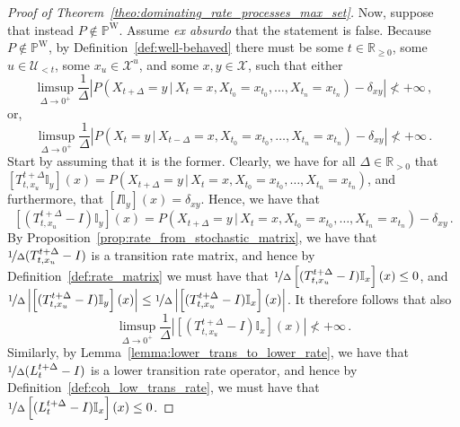 \documentclass[10pt]{paper}
\theoremstyle{definition}
\newcommand{\reals}{\mathbb{R}}
\newcommand{\realspos}{\reals_{>0}}
\newcommand{\realsnonneg}{\reals_{\geq 0}}
\newcommand{\states}{\mathcal{X}}
\newcommand{\processes}{\mathbb{P}}
\newcommand{\wprocesses}{\processes^{\mathrm{W}}}
\newcommand{\ind}[1]{\mathbb{I}_{#1}}
\newcommand{\abs}[1]{\left\vert #1 \right\vert}
\begin{document}
\begin{proof}[Proof of Theorem~\ref{theo:dominating_rate_processes_max_set}]
Now, suppose that instead $P\notin\wprocesses$. Assume \emph{ex absurdo} that the statement is false. Because $P\notin\wprocesses$, by Definition~\ref{def:well-behaved} there must be some $t\in\realsnonneg$, some $u\in\mathcal{U}_{<t}$, some $x_u\in\states^u$, and some $x,y\in\states$, such that either 
\begin{equation*}
\limsup_{\Delta\to0^+}\frac{1}{\Delta}\abs{P(X_{t+\Delta}=y\,\vert\,X_t=x,X_{t_0}=x_{t_0},\ldots,X_{t_n}=x_{t_n})-\delta_{xy}}\nless+\infty\,,
\end{equation*}
or,
\begin{equation*}
\limsup_{\Delta\to0^+}\frac{1}{\Delta}\abs{P(X_{t}=y\,\vert\,X_{t-\Delta}=x,X_{t_0}=x_{t_0},\ldots,X_{t_n}=x_{t_n})-\delta_{xy}}\nless+\infty\,.
\end{equation*}
Start by assuming that it is the former. Clearly, we have for all $\Delta\in\realspos$ that $\left[T_{t,x_u}^{t+\Delta}\ind{y}\right](x)=P(X_{t+\Delta}=y\,\vert\,X_t=x,X_{t_0}=x_{t_0},\ldots,X_{t_n}=x_{t_n})$, and furthermore, that $\left[I\ind{y}\right](x)=\delta_{xy}$. Hence, we have that
\begin{equation*}
\left[(T_{t,x_u}^{t+\Delta}-I)\ind{y}\right](x) = P(X_{t+\Delta}=y\,\vert\,X_t=x,X_{t_0}=x_{t_0},\ldots,X_{t_n}=x_{t_n}) - \delta_{xy}\,.
\end{equation*}
By Proposition~\ref{prop:rate_from_stochastic_matrix}, we have that $\nicefrac{1}{\Delta}(T_{t,x_u}^{t+\Delta}-I)$ is a transition rate matrix, and hence by Definition~\ref{def:rate_matrix} we must have that $\nicefrac{1}{\Delta}\left[(T_{t,x_u}^{t+\Delta}-I)\ind{x}\right](x)\leq 0$, and $\nicefrac{1}{\Delta}\abs{\left[(T_{t,x_u}^{t+\Delta}-I)\ind{y}\right](x)}\leq\nicefrac{1}{\Delta}\abs{\left[(T_{t,x_u}^{t+\Delta}-I)\ind{x}\right](x)}$. It therefore follows that also
\begin{equation}\label{eq:nonwellbehaved_limit_diagonal}
\limsup_{\Delta\to0^+}\frac{1}{\Delta}\abs{\left[(T_{t,x_u}^{t+\Delta}-I)\ind{x}\right](x)} \nless +\infty\,.
\end{equation}
Similarly, by Lemma~\ref{lemma:lower_trans_to_lower_rate}, we have that $\nicefrac{1}{\Delta}(L_t^{t+\Delta}-I)$ is a lower transition rate operator, and hence by Definition~\ref{def:coh_low_trans_rate}, we must have that $\nicefrac{1}{\Delta}\left[(L_t^{t+\Delta}-I)\ind{x}\right](x)\leq 0$. 


\end{proof}
\end{document}
